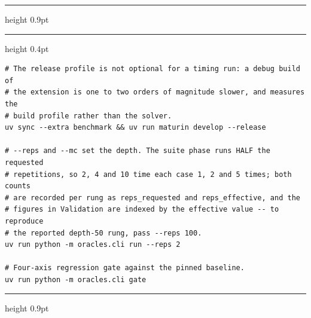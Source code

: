 \documentclass[border=6pt,varwidth=15.2cm]{standalone}
\begin{document}
\setcounter{lstlisting}{2}
\begin{minipage}{15.2cm}
\hrule height 0.9pt
\vspace{0.5em}
\vspace{0.2em}
\hrule height 0.4pt
\begin{lstlisting}
# The release profile is not optional for a timing run: a debug build of
# the extension is one to two orders of magnitude slower, and measures the
# build profile rather than the solver.
uv sync --extra benchmark && uv run maturin develop --release

# --reps and --mc set the depth. The suite phase runs HALF the requested
# repetitions, so 2, 4 and 10 time each case 1, 2 and 5 times; both counts
# are recorded per rung as reps_requested and reps_effective, and the
# figures in Validation are indexed by the effective value -- to reproduce
# the reported depth-50 rung, pass --reps 100.
uv run python -m oracles.cli run --reps 2

# Four-axis regression gate against the pinned baseline.
uv run python -m oracles.cli gate
\end{lstlisting}
\vspace{0.3em}
\hrule height 0.9pt
\end{minipage}
\end{document}
